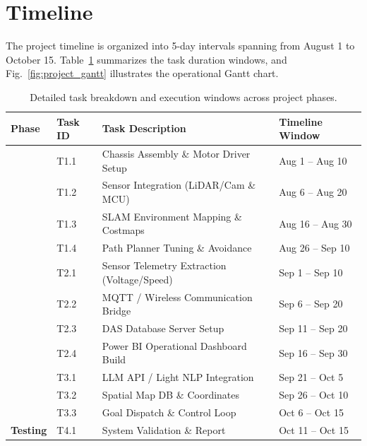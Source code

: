 \section{Timeline}
The project timeline is organized into 5-day intervals spanning from August 1 to October 15. Table~\ref{tab:project_schedule} summarizes the task duration windows, and Fig.~\ref{fig:project_gantt} illustrates the operational Gantt chart.

\begin{table}[htbp]
\centering
\small
\caption{Detailed task breakdown and execution windows across project phases.}
\label{tab:project_schedule}
\renewcommand{\arraystretch}{1.25}
\begin{tabularx}{\textwidth}{>{\raggedright\arraybackslash}p{1.8cm} >{\raggedright\arraybackslash}p{1.4cm} >{\raggedright\arraybackslash}X >{\raggedright\arraybackslash}p{3.2cm}}
\hline
\textbf{Phase} & \textbf{Task ID} & \textbf{Task Description} & \textbf{Timeline Window} \\ \hline
\multirow{4}{*}{\textbf{Phase 1}} 
 & T1.1 & Chassis Assembly \& Motor Driver Setup & Aug 1 -- Aug 10 \\ \cline{2-4}
 & T1.2 & Sensor Integration (LiDAR/Cam \& MCU) & Aug 6 -- Aug 20 \\ \cline{2-4}
 & T1.3 & SLAM Environment Mapping \& Costmaps & Aug 16 -- Aug 30 \\ \cline{2-4}
 & T1.4 & Path Planner Tuning \& Avoidance & Aug 26 -- Sep 10 \\ \hline
\multirow{4}{*}{\textbf{Phase 2}} 
 & T2.1 & Sensor Telemetry Extraction (Voltage/Speed) & Sep 1 -- Sep 10 \\ \cline{2-4}
 & T2.2 & MQTT / Wireless Communication Bridge & Sep 6 -- Sep 20 \\ \cline{2-4}
 & T2.3 & DAS Database Server Setup & Sep 11 -- Sep 20 \\ \cline{2-4}
 & T2.4 & Power BI Operational Dashboard Build & Sep 16 -- Sep 30 \\ \hline
\multirow{3}{*}{\textbf{Phase 3}} 
 & T3.1 & LLM API / Light NLP Integration & Sep 21 -- Oct 5 \\ \cline{2-4}
 & T3.2 & Spatial Map DB \& Coordinates & Sep 26 -- Oct 10 \\ \cline{2-4}
 & T3.3 & Goal Dispatch \& Control Loop & Oct 6 -- Oct 15 \\ \hline
\textbf{Testing} 
 & T4.1 & System Validation \& Report & Oct 11 -- Oct 15 \\ \hline
\end{tabularx}
\end{table}

